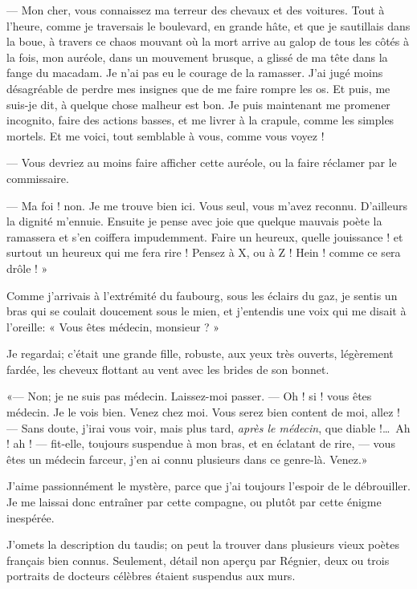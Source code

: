 --- Mon cher, vous connaissez ma terreur des chevaux et des voitures. Tout
à l’heure, comme je traversais le boulevard, en grande
hâte, et que je sautillais dans la boue, à travers ce chaos mouvant où
la mort arrive au galop de tous les côtés à la fois, mon auréole, dans
un mouvement brusque, a glissé de ma tête dans la fange du macadam. Je
n’ai pas eu le courage de la ramasser.
J’ai jugé moins désagréable de perdre mes insignes que
de me faire rompre les os. Et puis, me suis{}-je dit, à quelque chose
malheur est bon. Je puis maintenant me promener incognito, faire des
actions basses, et me livrer à la crapule, comme les simples mortels.
Et me voici, tout semblable à vous, comme vous voyez !

--- Vous devriez au moins faire afficher cette auréole, ou la faire
réclamer par le commissaire.

--- Ma foi ! non. Je me trouve bien ici. Vous seul, vous
m’avez reconnu. D’ailleurs la dignité
m’ennuie. Ensuite je pense avec joie que quelque
mauvais poète la ramassera et s’en coiffera
impudemment. Faire un heureux, quelle jouissance ! et surtout un
heureux qui me fera rire ! Pensez à X, ou à Z ! Hein ! comme ce sera
drôle ! »


Comme j’arrivais à l’extrémité du
faubourg, sous les éclairs du gaz, je sentis un bras qui se coulait
doucement sous le mien, et j’entendis une voix qui me
disait à l’oreille: « Vous êtes médecin, monsieur ? »

Je regardai; c’était une grande fille, robuste, aux
yeux très ouverts, légèrement fardée, les cheveux flottant au vent
avec les brides de son bonnet.

«--- Non; je ne suis pas médecin. Laissez{}-moi passer. --- Oh ! si ! vous
êtes médecin. Je le vois bien. Venez chez moi. Vous serez bien content
de moi, allez ! --- Sans doute, j’irai vous voir, mais
plus tard, \textit{après le médecin}, que diable !\ldots\ Ah ! ah ! --- fit{}-elle,
toujours suspendue à mon bras, et en éclatant de rire, --- vous êtes un
médecin farceur, j’en ai connu plusieurs dans ce
genre{}-là. Venez.»

J’aime passionnément le mystère, parce que
j’ai toujours l’espoir de le
débrouiller. Je me laissai donc entraîner par cette compagne, ou plutôt
par cette énigme inespérée.

J’omets la description du taudis; on peut la trouver
dans plusieurs vieux poètes français bien connus. Seulement, détail non
aperçu par Régnier, deux ou trois portraits de docteurs célèbres
étaient suspendus aux murs.

